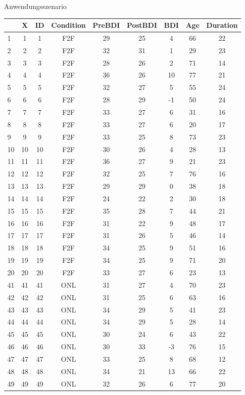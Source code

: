 \documentclass[
  8pt,
  ignorenonframetext,
]{beamer}
\begin{document}
\begin{frame}[fragile]{Anwendungsszenario}
\begin{longtable}[]{@{}lcccccccc@{}}
\toprule
& X & ID & Condition & PreBDI & PostBDI & BDI & Age & Duration \\
\midrule
\endhead
1 & 1 & 1 & F2F & 29 & 25 & 4 & 66 & 22 \\
2 & 2 & 2 & F2F & 32 & 31 & 1 & 29 & 23 \\
3 & 3 & 3 & F2F & 28 & 26 & 2 & 71 & 14 \\
4 & 4 & 4 & F2F & 36 & 26 & 10 & 77 & 21 \\
5 & 5 & 5 & F2F & 32 & 27 & 5 & 55 & 24 \\
6 & 6 & 6 & F2F & 28 & 29 & -1 & 50 & 24 \\
7 & 7 & 7 & F2F & 33 & 27 & 6 & 31 & 16 \\
8 & 8 & 8 & F2F & 33 & 27 & 6 & 20 & 17 \\
9 & 9 & 9 & F2F & 33 & 25 & 8 & 73 & 23 \\
10 & 10 & 10 & F2F & 30 & 26 & 4 & 28 & 13 \\
11 & 11 & 11 & F2F & 36 & 27 & 9 & 21 & 23 \\
12 & 12 & 12 & F2F & 32 & 25 & 7 & 76 & 16 \\
13 & 13 & 13 & F2F & 29 & 29 & 0 & 38 & 18 \\
14 & 14 & 14 & F2F & 24 & 22 & 2 & 30 & 18 \\
15 & 15 & 15 & F2F & 35 & 28 & 7 & 44 & 21 \\
16 & 16 & 16 & F2F & 31 & 22 & 9 & 48 & 17 \\
17 & 17 & 17 & F2F & 31 & 26 & 5 & 46 & 14 \\
18 & 18 & 18 & F2F & 34 & 25 & 9 & 51 & 16 \\
19 & 19 & 19 & F2F & 34 & 25 & 9 & 71 & 20 \\
20 & 20 & 20 & F2F & 33 & 27 & 6 & 23 & 13 \\
41 & 41 & 41 & ONL & 31 & 27 & 4 & 70 & 23 \\
42 & 42 & 42 & ONL & 31 & 25 & 6 & 63 & 16 \\
43 & 43 & 43 & ONL & 34 & 29 & 5 & 41 & 23 \\
44 & 44 & 44 & ONL & 34 & 29 & 5 & 28 & 14 \\
45 & 45 & 45 & ONL & 30 & 24 & 6 & 43 & 22 \\
46 & 46 & 46 & ONL & 30 & 33 & -3 & 76 & 15 \\
47 & 47 & 47 & ONL & 33 & 25 & 8 & 68 & 12 \\
48 & 48 & 48 & ONL & 34 & 21 & 13 & 66 & 22 \\
49 & 49 & 49 & ONL & 32 & 26 & 6 & 77 & 20 \\

\end{longtable}
\end{frame}
\end{document}
